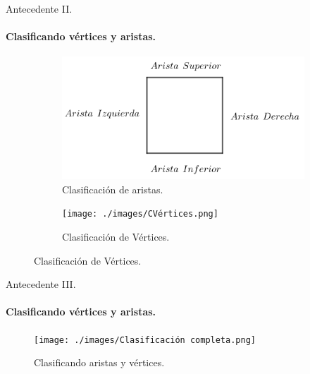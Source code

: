 \begin{frame}{Antecedente II.} %
  \framesubtitle{Clasificando vértices y aristas.} %
  \begin{figure}
    \centering
    \begin{subfigure}[b]{0.4\paperwidth}
      \includegraphics[width=0.4\paperwidth]{./images/CAristas.png}
      \caption*{Clasificación de aristas.}
    \end{subfigure}
        \begin{subfigure}[b]{0.4\paperwidth}
      \texttt{[image: ./images/CVértices.png]}
      \caption*{Clasificación de Vértices.}
    \end{subfigure}
  \end{figure}
\end{frame}

\begin{frame}{Antecedente III.} %
  \framesubtitle{Clasificando vértices y aristas.} %
  \begin{figure}
    \centering
    \texttt{[image: ./images/Clasificación completa.png]}
    \caption*{Clasificando aristas y vértices.}
  \end{figure}
\end{frame}

